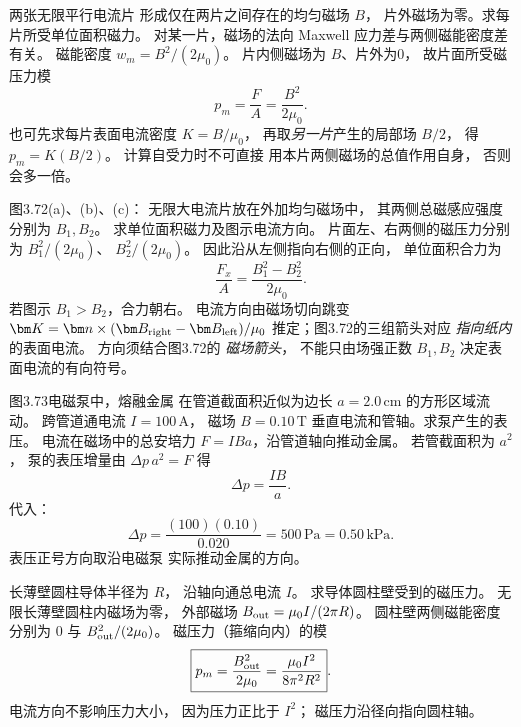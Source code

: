 两张无限平行电流片
形成仅在两片之间存在的均匀磁场 $B$，
片外磁场为零。求每片所受单位面积磁力。
\exsolution
对某一片，磁场的法向 Maxwell
应力差与两侧磁能密度差有关。
磁能密度 $w_m=B^2/(2\mu_0)$。
片内侧磁场为 $B$、片外为0，
故片面所受磁压力模
\[
\boxed{p_m=\frac FA=\frac{B^2}{2\mu_0}}.
\]
也可先求每片表面电流密度
$K=B/\mu_0$，
再取\emph{另一片}产生的局部场 $B/2$，
得 $p_m=K(B/2)$。
\excheck 计算自受力时不可直接
用本片两侧磁场的总值作用自身，
否则会多一倍。

图3.72(a)、(b)、(c)：
无限大电流片放在外加均匀磁场中，
其两侧总磁感应强度分别为
$B_1,B_2$。
求单位面积磁力及图示电流方向。
\exsolution
片面左、右两侧的磁压力分别为
$B_1^2/(2\mu_0)$、
$B_2^2/(2\mu_0)$。
因此沿从左侧指向右侧的正向，
单位面积合力为
\[
\boxed{\frac{F_x}{A}=
\frac{B_1^2-B_2^2}{2\mu_0}}.
\]
若图示 $B_1>B_2$，合力朝右。
电流方向由磁场切向跳变
$\bm K=\bm n\times
(\bm B_{\rm right}-\bm B_{\rm left})/\mu_0$
推定；图3.72的三组箭头对应
\emph{指向纸内}的表面电流。
\excheck 方向须结合图3.72的
\emph{磁场箭头}，
不能只由场强正数 $B_1,B_2$
决定表面电流的有向符号。

图3.73电磁泵中，熔融金属
在管道截面积近似为边长
$a=2.0\,\mathrm{cm}$ 的方形区域流动。
跨管道通电流 $I=100\,\mathrm A$，
磁场 $B=0.10\,\mathrm T$
垂直电流和管轴。求泵产生的表压。
\exsolution
电流在磁场中的总安培力
$F=IBa$，沿管道轴向推动金属。
若管截面积为 $a^2$，
泵的表压增量由
$\Delta p\,a^2=F$ 得
\[
\boxed{\Delta p=\frac{IB}{a}}.
\]
代入：
\[
\boxed{\Delta p=
\frac{(100)(0.10)}{0.020}
=500\,\mathrm{Pa}=0.50\,\mathrm{kPa}}.
\]
\excheck 表压正号方向取沿电磁泵
实际推动金属的方向。

长薄壁圆柱导体半径为 $R$，
沿轴向通总电流 $I$。
求导体圆柱壁受到的磁压力。
\exsolution
无限长薄壁圆柱内磁场为零，
外部磁场
$B_{\rm out}=\mu_0I/(2\pi R)$。
圆柱壁两侧磁能密度分别为
0 与
$B_{\rm out}^2/(2\mu_0)$。
磁压力（箍缩向内）的模
\[
\boxed{p_m=\frac{B_{\rm out}^2}{2\mu_0}
=\frac{\mu_0I^2}{8\pi^2R^2}}.
\]
\excheck 电流方向不影响压力大小，
因为压力正比于 $I^2$；
磁压力沿径向指向圆柱轴。
